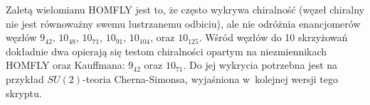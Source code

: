 Zaletą wielomianu HOMFLY jest to, że często wykrywa chiralność (węzeł chiralny nie jest równoważny swemu lustrzanemu odbiciu), ale nie odróżnia enancjomerów węzłów $9_{42}$, $10_{48}$, $10_{71}$, $10_{91}$, $10_{104}$, oraz $10_{125}$.
Wśród węzłów do 10 skrzyżowań dokładnie dwa opierają się testom chiralności opartym na niezmiennikach HOMFLY oraz Kauffmana: $9_{42}$ oraz $10_{71}$.
Do jej wykrycia potrzebna jest na przykład $SU(2)$-teoria Cherna-Simonsa, wyjaśniona w~kolejnej wersji tego skryptu.




